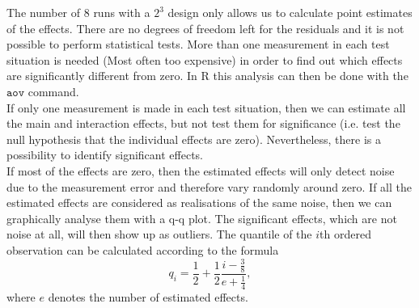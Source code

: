 The number of $8$ runs with a $2^3$ design only allows us to calculate point estimates of the effects. There are no degrees of freedom left for the residuals and it is not possible to perform statistical tests. More than one measurement in each test situation is needed (Most often too expensive) in order to find out which effects are significantly different from zero. In R this analysis can then be done with the $\texttt{aov}$ command.\\

If only one measurement is made in each test situation, then we can estimate all the main and interaction effects, but not test them for significance (i.e. test the null hypothesis that the individual effects are zero). Nevertheless, there is a possibility to identify significant effects.\\
If most of the effects are zero, then the estimated effects will only detect noise due to the measurement error and therefore vary randomly around zero. If all the estimated effects are considered as realisations of the same noise, then we can graphically analyse them with a q-q plot. The significant effects, which are not noise at all, will then show up as outliers. The quantile of the $i$th ordered observation can be calculated
according to the formula
\begin{equation}
  q_i = \frac{1}{2} + \frac{1}{2}\frac{i - \frac{3}{8}}{e + \frac{1}{4}},
\end{equation}
where $e$ denotes the number of estimated effects.
